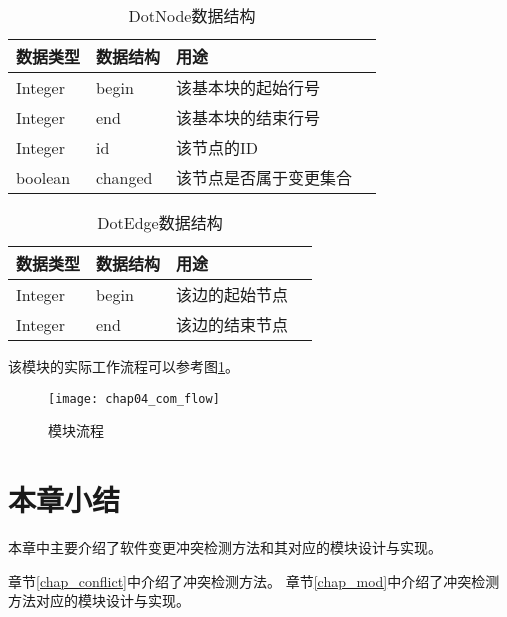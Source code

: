 \begin{table}[H]
	\caption{DotNode数据结构}
	\label{node_data}
	\centering
	\begin{tabular}{lllc}
		\toprule[1.5pt]
		{\heiti 数据类型} &{\heiti 数据结构} & {\heiti 用途} \\\midrule[1pt]
		Integer    &   begin & 该基本块的起始行号 \\
		Integer    &   end  & 该基本块的结束行号 \\
		Integer    & id & 该节点的ID \\
		boolean    & changed & 该节点是否属于变更集合 \\
		\bottomrule[1.5pt] 
	\end{tabular}
\end{table}

\begin{table}[H]
	\caption{DotEdge数据结构}
	\label{edge_data}
	\centering
	\begin{tabular}{lllc}
		\toprule[1.5pt]
		{\heiti 数据类型} &{\heiti 数据结构} & {\heiti 用途} \\\midrule[1pt]
		Integer   & begin & 该边的起始节点 \\
		Integer  &   end & 该边的结束节点 \\
		\bottomrule[1.5pt] 
	\end{tabular}
\end{table}

该模块的实际工作流程可以参考图\ref {com_flow}。

\begin{figure}[H]
	\centering
	\texttt{[image: chap04\_com\_flow]}
	\caption {模块流程}
	\label {com_flow}	
\end{figure}

\section{本章小结}

本章中主要介绍了软件变更冲突检测方法和其对应的模块设计与实现。

章节\ref {chap_conflict}中介绍了冲突检测方法。
章节\ref {chap_mod}中介绍了冲突检测方法对应的模块设计与实现。